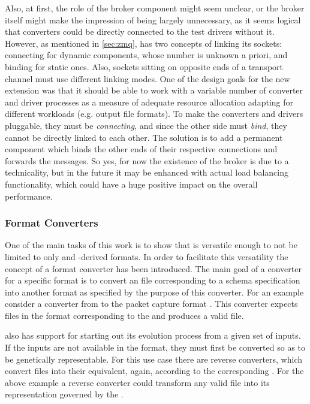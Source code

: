 Also, at first, the role of the broker component might seem unclear, or the broker itself might make the
impression of being largely unnecessary, as it seems logical that converters could be directly connected to
the test drivers without it. However, as mentioned in \cref{sec:zmq}, \zmq has two concepts of linking its
sockets: connecting for dynamic components, whose number is unknown a priori, and binding for static ones.
Also, sockets sitting on opposite ends of a transport channel must use different linking modes.
One of the design goals for the new \xmlmate extension was that it should be able to work with a variable
number of converter and driver processes as a measure of adequate resource allocation adapting for different
workloads (e.g. output file formats). To make the converters and drivers pluggable, they must be
\emph{connecting}, and since the other side must \emph{bind}, they cannot be directly linked to each other. 
The solution is to add a permanent component which binds the other ends of their respective connections and
forwards the messages. So yes, for now the existence of the broker is due to a technicality, but in the future
it may be enhanced with actual load balancing functionality, which could have a huge positive impact on the
overall performance.

\subsubsection{Format Converters}
One of the main tasks of this work is to show that \xmlmate is versatile enough to not be limited to 
only \xml and \xml-derived formats. In order to facilitate this versatility the concept of a format 
converter has been introduced. The main goal of a converter for a specific format is to convert an 
\xml file corresponding to a schema specification into another format as specified by the purpose 
of this converter. For an example consider a converter from \xml to the packet capture format \pcap. 
This converter expects \xml files in the format corresponding to the \pcap{} \xsd and produces a 
valid \pcap file. 


\xmlmate also has support for starting out its evolution process from a given set of inputs. If the   
inputs are not available in the \xml format, they must first be converted so as to be genetically 
representable. For this use case there are reverse converters, which convert files into their 
\xml equivalent, again, according to the corresponding \xsd. For the above example a reverse converter 
could transform any valid \pcap file into its \xml representation governed by the \pcap{} \xsd.
